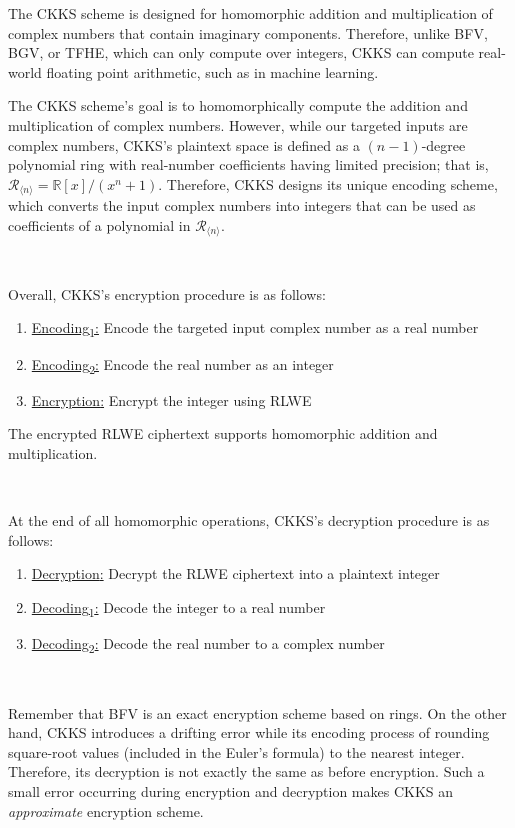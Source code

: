 The CKKS scheme is designed for homomorphic addition and multiplication of complex numbers that contain imaginary components. Therefore, unlike BFV, BGV, or TFHE, which can only compute over integers, CKKS can compute real-world floating point arithmetic, such as in machine learning.


The CKKS scheme's goal is to homomorphically compute the addition and multiplication of complex numbers. However, while our targeted inputs are complex numbers, CKKS's plaintext space is defined as a $(n-1)$-degree polynomial ring with real-number coefficients having limited precision; that is, $\mathcal{R}_{\langle n \rangle} = \mathbb{R}[x] / (x^n + 1)$. Therefore, CKKS designs its unique encoding scheme, which converts the input complex numbers into integers that can be used as coefficients of a polynomial in $\mathcal{R}_{\langle n \rangle}$. 


$ $

\noindent Overall, CKKS's encryption procedure is as follows:

\begin{enumerate}
\item \underline{\textsf{Encoding\textsubscript{1}}:} Encode the targeted input complex number as a real number
\item \underline{\textsf{Encoding\textsubscript{2}}:} Encode the real number as an integer
\item \underline{\textsf{Encryption}:} Encrypt the integer using RLWE 
\end{enumerate}
The encrypted RLWE ciphertext supports homomorphic addition and multiplication. 

$ $

\noindent At the end of all homomorphic operations, CKKS's decryption procedure is as follows: 

\begin{enumerate}
\item \underline{\textsf{Decryption}:} Decrypt the RLWE ciphertext into a plaintext integer
\item \underline{\textsf{Decoding\textsubscript{1}}:} Decode the integer to a real number
\item \underline{\textsf{Decoding\textsubscript{2}}:} Decode the real number to a complex number
\end{enumerate}

$ $


Remember that BFV is an exact encryption scheme based on rings. On the other hand, CKKS introduces a drifting error while its encoding process of rounding square-root values (included in the Euler's formula) to the nearest integer. Therefore, its decryption is not exactly the same as before encryption. Such a small error occurring during encryption and decryption makes CKKS an \textit{approximate} encryption scheme. 

